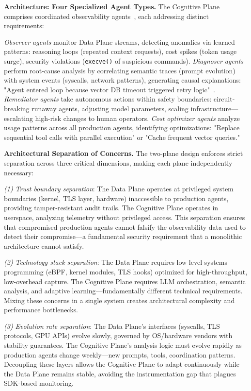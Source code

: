 \documentclass[sigplan,screen,9pt]{acmart}
\begin{document}
\textbf{Architecture: Four Specialized Agent Types.} The Cognitive Plane comprises coordinated observability agents~\cite{Rombaut2025Watson,Kim2025AgenticInterp,Dong2024AgentOps}, each addressing distinct requirements:

\emph{Observer agents} monitor Data Plane streams, detecting anomalies via learned patterns: reasoning loops (repeated context requests), cost spikes (token usage surge), security violations (\texttt{execve()} of suspicious commands). \emph{Diagnoser agents} perform root-cause analysis by correlating semantic traces (prompt evolution) with system events (syscalls, network patterns), generating causal explanations: "Agent entered loop because vector DB timeout triggered retry logic"~\cite{Moshkovich2025Pipeline}. \emph{Remediator agents} take autonomous actions within safety boundaries: circuit-breaking runaway agents, adjusting model parameters, scaling infrastructure—escalating high-risk changes to human operators. \emph{Cost optimizer agents} analyze usage patterns across all production agents, identifying optimizations: "Replace sequential tool calls with parallel execution" or "Cache frequent vector queries."

\textbf{Architectural Separation of Concerns.} The two-plane design enforces strict separation across three critical dimensions, making each plane independently necessary:

\emph{(1) Trust boundary separation}: The Data Plane operates at privileged system boundaries (kernel, TLS layer, hardware) inaccessible to production agents, providing tamper-resistant audit trails. The Cognitive Plane operates in userspace, analyzing telemetry without privileged access. This separation ensures that compromised production agents cannot falsify the observability data used to detect their compromise—a fundamental security requirement that a monolithic architecture cannot satisfy.

\emph{(2) Technology stack separation}: The Data Plane requires low-level systems programming (eBPF, kernel modules, TLS hooks) optimized for high-throughput, low-overhead capture. The Cognitive Plane requires LLM orchestration, semantic analysis, and adaptive learning—fundamentally different technical requirements. Mixing these concerns in a single system creates architectural complexity and performance bottlenecks.

\emph{(3) Evolution rate separation}: The Data Plane's interfaces (syscalls, TLS protocols, GPU APIs) evolve slowly, governed by OS/hardware vendors with stability guarantees. The Cognitive Plane's analysis logic must evolve rapidly as production agents change weekly—new prompts, tools, coordination patterns. Decoupling these layers allows the Cognitive Plane to adapt continuously while the Data Plane remains stable, avoiding the instrumentation gap that plagues SDK-based monitoring.
\end{document}
